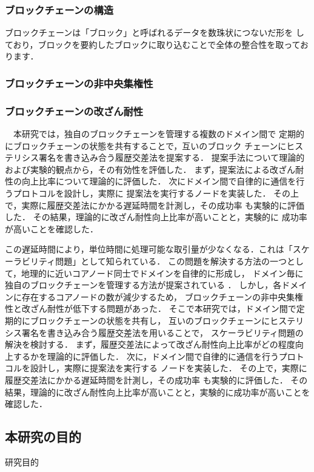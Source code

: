 \documentclass[a4paper,12pt]{jsarticle}
\begin{document}
\subsubsection{ブロックチェーンの構造}

ブロックチェーンは「ブロック」と呼ばれるデータを数珠状につないだ形を
しており，ブロックを要約したブロックに取り込むことで全体の整合性を取っております．

\subsubsection{ブロックチェーンの非中央集権性}


\subsubsection{ブロックチェーンの改ざん耐性}

　本研究では，独自のブロックチェーンを管理する複数のドメイン間で
定期的にブロックチェーンの状態を共有することで，互いのブロック
チェーンにヒステリシス署名を書き込み合う履歴交差法を提案する．
提案手法について理論的および実験的観点から，その有効性を評価した．
まず，提案法による改ざん耐性の向上比率について理論的に評価した．
次にドメイン間で自律的に通信を行うプロトコルを設計し，実際に
提案法を実行するノードを実装した．
その上で，実際に履歴交差法にかかる遅延時間を計測し，その成功率
も実験的に評価した．
その結果，理論的に改ざん耐性向上比率が高いことと，実験的に
成功率が高いことを確認した．

この遅延時間により，単位時間に処理可能な取引量が少なくなる．これは「スケーラビリティ問題」として知られている．
この問題を解決する方法の一つとして，地理的に近いコアノード同士でドメインを自律的に形成し，
ドメイン毎に独自のブロックチェーンを管理する方法が提案されている \cite{fujihara1}\cite{fujihara2}．
しかし，各ドメインに存在するコアノードの数が減少するため，
ブロックチェーンの非中央集権性と改ざん耐性が低下する問題があった．
そこで本研究では，ドメイン間で定期的にブロックチェーンの状態を共有し，
互いのブロックチェーンにヒステリシス署名\cite{suzaki}を書き込み合う履歴交差法を用いることで，
スケーラビリティ問題の解決を検討する．
まず，履歴交差法によって改ざん耐性向上比率がどの程度向上するかを理論的に評価した．
次に，ドメイン間で自律的に通信を行うプロトコルを設計し，実際に提案法を実行する
ノードを実装した．
その上で，実際に履歴交差法にかかる遅延時間を計測し，その成功率
も実験的に評価した．
その結果，理論的に改ざん耐性向上比率が高いことと，実験的に成功率が高いことを確認した．

\subsection{本研究の目的}
研究目的
\end{document}
